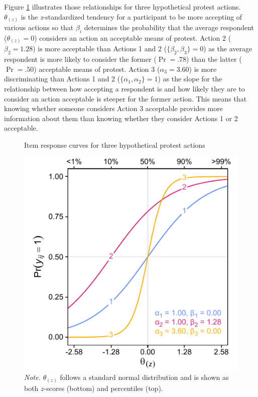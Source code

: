\documentclass[12pt, letterpaper]{article}
\begin{document}
Figure \ref{fig:f1} illustrates those relationships for three
hypothetical protest actions. \(\theta_{(z)}\) is the
\emph{z}-standardized tendency for a participant to be more accepting of
various actions so that \(\beta_i\) determines the probability that the
average respondent (\(\theta_{(z)} = 0\)) considers an action an
acceptable means of protest. Action 2 (\(\beta_2 = 1.28\)) is more
acceptable than Actions 1 and 2 (\(\{ \beta_2, \beta_3 \} = 0\)) as the
average respondent is more likely to consider the former (\(\Pr = .78\))
than the latter (\(\Pr = .50\)) acceptable means of protest. Action 3
(\(\alpha_3 = 3.60\)) is more discriminating than Actions 1 and 2
(\(\{ \alpha_1, \alpha_2 \} = 1\)) as the slope for the relationship
between how accepting a respondent is and how likely they are to
consider an action acceptable is steeper for the former action. This
means that knowing whether someone considers Action 3 acceptable
provides more information about them than knowing whether they consider
Actions 1 or 2 acceptable.

\begin{figure}
\centering
\caption{Item response curves for three hypothetical protest actions}
\includegraphics[scale=1]{../Scale Development/figures/figure-1}
\caption*{\textit{Note.} $\theta_{(z)}$ follows a standard normal distribution and is shown as both $z$-scores (bottom) and percentiles (top).}
\label{fig:f1}
\end{figure}
\end{document}
